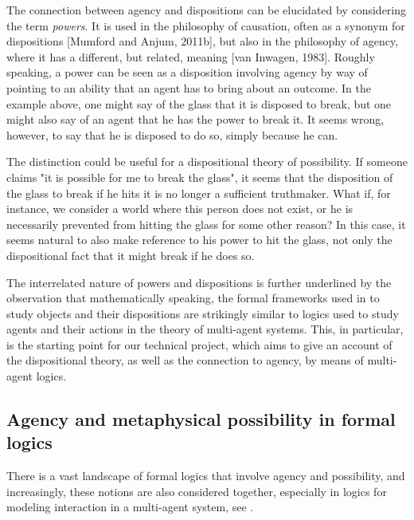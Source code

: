 \documentclass{article}
\begin{document}
The connection between agency and dispositions can be elucidated by considering the term \emph{powers}. It is used in the philosophy of causation, often as a
synonym for dispositions [Mumford and Anjum, 2011b], but also in the philosophy of
agency, where it has a different, but related, meaning [van Inwagen, 1983]. Roughly
speaking, a power can be seen as a disposition involving agency by way of pointing to
an ability that an agent has to bring about an outcome. In the example above, one
might say of the glass that it is disposed to break, but one might also say of an agent that
he has the power to break it. It seems wrong, however, to say that he is disposed to
do so, simply because he can.

The distinction could be useful for a dispositional theory of possibility. If someone claims "it is possible for me to break the glass", it seems that the disposition of the glass to break if he hits it is no longer a sufficient truthmaker. What if, for instance, we consider a world where this person does not exist, or he is necessarily prevented from hitting the glass for some other reason? In this case, it seems natural to also make reference to his power to hit the glass, not only the dispositional fact that it might break if he does so. 

The interrelated nature of powers and dispositions is further underlined by the observation that mathematically  speaking, the formal frameworks used in \cite{powmod,PhDpos} to study objects and their dispositions are strikingly similar to logics used to study agents and their actions in the theory of multi-agent systems. This, in particular, is the starting point for our technical project, which aims to give an account of the dispositional theory, as well as the connection to agency, by means of multi-agent logics.

\subsection*{Agency and metaphysical possibility in formal logics}

There is a vast landscape of formal logics that involve agency and possibility, and increasingly, these notions are also considered together, especially in logics for modeling interaction in a multi-agent system, see \cite{IMAS,Benthem}.
\end{document}
